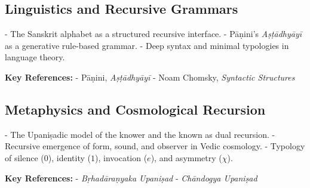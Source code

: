 \subsection{Linguistics and Recursive Grammars}

- The Sanskrit alphabet as a structured recursive interface.
- Pāṇini’s \textit{Aṣṭādhyāyī} as a generative rule-based grammar.
- Deep syntax and minimal typologies in language theory.

\textbf{Key References:}
- Pāṇini, \textit{Aṣṭādhyāyī}  
- Noam Chomsky, \textit{Syntactic Structures}

\subsection{Metaphysics and Cosmological Recursion}

- The Upaniṣadic model of the knower and the known as dual recursion.
- Recursive emergence of form, sound, and observer in Vedic cosmology.
- Typology of silence ($0$), identity ($1$), invocation ($e$), and asymmetry ($\chi$).

\textbf{Key References:}
- \textit{Bṛhadāraṇyaka Upaniṣad}  
- \textit{Chāndogya Upaniṣad}
